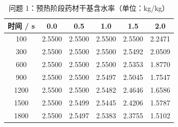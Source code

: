 \begin{table}[htbp]
\centering
\caption{问题 1：预热阶段药材干基含水率（单位：kg/kg）}
\label{table_02_p1_moisture}
\begin{tabular}{cccccc}
\toprule
时间 / s & 0.0 & 0.5 & 1.0 & 1.5 & 2.0 \\
\midrule
100 & 2.5500 & 2.5500 & 2.5500 & 2.5500 & 2.2471 \\
300 & 2.5500 & 2.5500 & 2.5500 & 2.5492 & 2.0509 \\
600 & 2.5500 & 2.5500 & 2.5500 & 2.5353 & 1.8770 \\
900 & 2.5500 & 2.5500 & 2.5497 & 2.5045 & 1.7547 \\
1200 & 2.5500 & 2.5500 & 2.5482 & 2.4646 & 1.6586 \\
1500 & 2.5500 & 2.5499 & 2.5445 & 2.4206 & 1.5787 \\
1800 & 2.5500 & 2.5497 & 2.5383 & 2.3755 & 1.5102 \\
\bottomrule
\end{tabular}
\end{table}
